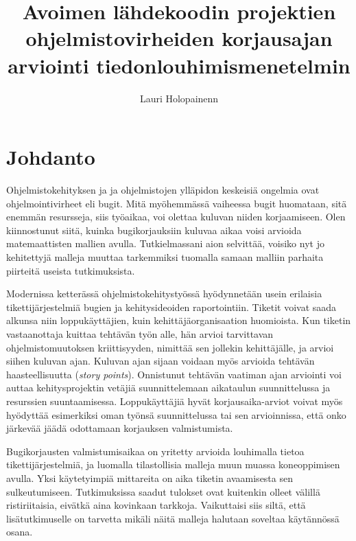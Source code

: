 \documentclass[utf8]{gradu3}
\begin{document}
\title{Avoimen lähdekoodin projektien ohjelmistovirheiden korjausajan arviointi tiedonlouhimismenetelmin}
 \avainsanat{} \keywords{}
\abstract{}

\author{Lauri Holopainenn}

\maketitle

\mainmatter

\chapter{Johdanto}
Ohjelmistokehityksen ja  ja ohjelmistojen ylläpidon keskeisiä ongelmia ovat
ohjelmointivirheet eli bugit. Mitä myöhemmässä vaiheessa bugit huomataan, sitä
enemmän resursseja, siis työaikaa, voi olettaa kuluvan niiden korjaamiseen. Olen
kiinnostunut siitä, kuinka bugikorjauksiin kuluvaa aikaa voisi arvioida
matemaattisten mallien avulla. Tutkielmassani aion selvittää, voisiko nyt jo
kehitettyjä malleja muuttaa tarkemmiksi tuomalla samaan malliin parhaita
piirteitä useista tutkimuksista.

Modernissa ketterässä ohjelmistokehitystyössä hyödynnetään usein erilaisia
tikettijärjestelmiä bugien ja kehitysideoiden raportointiin. Tiketit voivat
saada alkunsa niin loppukäyttäjien, kuin kehittäjäorganisaation huomioista. Kun
tiketin vastaanottaja kuittaa tehtävän työn alle, hän arvioi tarvittavan
ohjelmistomuutoksen kriittisyyden, nimittää sen jollekin kehittäjälle, ja arvioi
siihen kuluvan ajan. Kuluvan ajan sijaan voidaan myös arvioida tehtävän
haasteellisuutta (\textit{story points}). Onnistunut tehtävän vaatiman ajan
arviointi voi auttaa kehitysprojektin vetäjiä suunnittelemaan aikataulun
suunnittelussa ja resurssien suuntaamisessa. Loppukäyttäjiä hyvät
korjausaika-arviot voivat myös hyödyttää esimerkiksi oman työnsä suunnittelussa
tai sen arvioinnissa, että onko järkevää jäädä odottamaan korjauksen
valmistumista.

Bugikorjausten valmistumisaikaa on yritetty arvioida louhimalla tietoa
tikettijärjestelmiä, ja luomalla tilastollisia malleja muun muassa koneoppimisen
avulla. Yksi käytetyimpiä mittareita on aika tiketin avaamisesta sen
sulkeutumiseen. Tutkimuksissa saadut tulokset ovat kuitenkin olleet välillä
ristiriitaisia, eivätkä aina kovinkaan tarkkoja. Vaikuttaisi siis siltä, että
lisätutkimuselle on tarvetta mikäli näitä malleja halutaan soveltaa käytännössä
osana.
\end{document}
